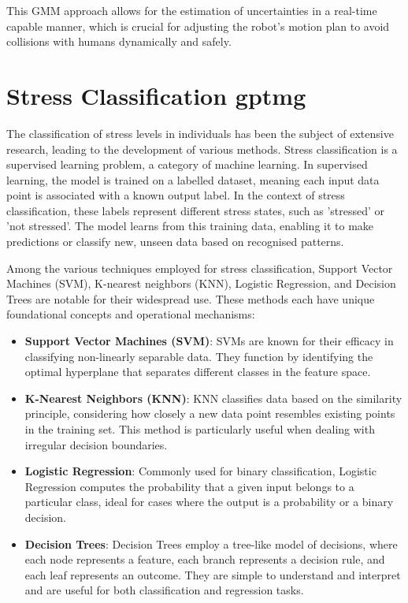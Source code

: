 This GMM approach allows for the estimation of uncertainties in a real-time capable manner, which is crucial for adjusting the robot's motion plan to avoid collisions with humans dynamically and safely.


\section{Stress Classification \gls{gptmg}}
The classification of stress levels in individuals has been the subject of extensive research, leading to the development of various methods. Stress classification is a supervised learning problem, a category of machine learning. In supervised learning, the model is trained on a labelled dataset, meaning each input data point is associated with a known output label. In the context of stress classification, these labels represent different stress states, such as 'stressed' or 'not stressed'. The model learns from this training data, enabling it to make predictions or classify new, unseen data based on recognised patterns.

Among the various techniques employed for stress classification, Support Vector Machines (SVM), K-nearest neighbors (KNN), Logistic Regression, and Decision Trees are notable for their widespread use. These methods each have unique foundational concepts and operational mechanisms:

\begin{itemize}
    \item \textbf{Support Vector Machines (SVM)}: SVMs are known for their efficacy in classifying non-linearly separable data. They function by identifying the optimal hyperplane that separates different classes in the feature space.
    \item \textbf{K-Nearest Neighbors (KNN)}: KNN classifies data based on the similarity principle, considering how closely a new data point resembles existing points in the training set. This method is particularly useful when dealing with irregular decision boundaries.
    \item \textbf{Logistic Regression}: Commonly used for binary classification, Logistic Regression computes the probability that a given input belongs to a particular class, ideal for cases where the output is a probability or a binary decision.
    \item \textbf{Decision Trees}: Decision Trees employ a tree-like model of decisions, where each node represents a feature, each branch represents a decision rule, and each leaf represents an outcome. They are simple to understand and interpret and are useful for both classification and regression tasks.
\end{itemize}

